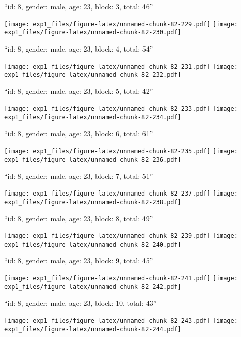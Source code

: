 \documentclass[11pt,,]{article}
\begin{document}
\newpage
[1] 

``id: 8, gender: male, age: 23, block: 3, total: 46''

\texttt{[image: exp1\_files/figure-latex/unnamed-chunk-82-229.pdf]}
\texttt{[image: exp1\_files/figure-latex/unnamed-chunk-82-230.pdf]}

\newpage
[1] 

``id: 8, gender: male, age: 23, block: 4, total: 54''

\texttt{[image: exp1\_files/figure-latex/unnamed-chunk-82-231.pdf]}
\texttt{[image: exp1\_files/figure-latex/unnamed-chunk-82-232.pdf]}

\newpage
[1] 

``id: 8, gender: male, age: 23, block: 5, total: 42''

\texttt{[image: exp1\_files/figure-latex/unnamed-chunk-82-233.pdf]}
\texttt{[image: exp1\_files/figure-latex/unnamed-chunk-82-234.pdf]}

\newpage
[1] 

``id: 8, gender: male, age: 23, block: 6, total: 61''

\texttt{[image: exp1\_files/figure-latex/unnamed-chunk-82-235.pdf]}
\texttt{[image: exp1\_files/figure-latex/unnamed-chunk-82-236.pdf]}

\newpage
[1] 

``id: 8, gender: male, age: 23, block: 7, total: 51''

\texttt{[image: exp1\_files/figure-latex/unnamed-chunk-82-237.pdf]}
\texttt{[image: exp1\_files/figure-latex/unnamed-chunk-82-238.pdf]}

\newpage
[1] 

``id: 8, gender: male, age: 23, block: 8, total: 49''

\texttt{[image: exp1\_files/figure-latex/unnamed-chunk-82-239.pdf]}
\texttt{[image: exp1\_files/figure-latex/unnamed-chunk-82-240.pdf]}

\newpage
[1] 

``id: 8, gender: male, age: 23, block: 9, total: 45''

\texttt{[image: exp1\_files/figure-latex/unnamed-chunk-82-241.pdf]}
\texttt{[image: exp1\_files/figure-latex/unnamed-chunk-82-242.pdf]}

\newpage
[1] 

``id: 8, gender: male, age: 23, block: 10, total: 43''

\texttt{[image: exp1\_files/figure-latex/unnamed-chunk-82-243.pdf]}
\texttt{[image: exp1\_files/figure-latex/unnamed-chunk-82-244.pdf]}
\end{document}
